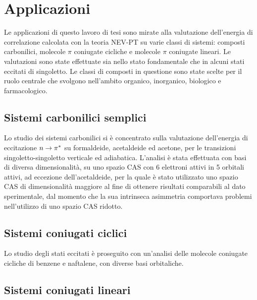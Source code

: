 \chapter{Applicazioni}
\label{cap:applicazioni}

Le applicazioni di questo lavoro di tesi sono mirate alla valutazione
dell'energia di correlazione calcolata con la teoria NEV-PT su
varie classi di sistemi: composti carbonilici, 
molecole $\pi$ coniugate cicliche e molecole $\pi$ coniugate lineari. Le
valutazioni sono state effettuate sia nello stato fondamentale che in alcuni
stati eccitati di singoletto. Le classi di composti in questione sono state
scelte per il ruolo centrale che svolgono nell'ambito organico, inorganico,
biologico e farmacologico.  

\section{Sistemi carbonilici semplici}

Lo studio dei sistemi carbonilici si \`e concentrato sulla valutazione
dell'energia di eccitazione $n \rightarrow \pi^{*}$ su formaldeide,
acetaldeide ed acetone, per le transizioni singoletto-singoletto
verticale ed adiabatica. L'analisi \`e stata effettuata con basi di diversa
dimensionalit\`a, su uno spazio CAS con 6 elettroni attivi in 5 orbitali attivi,
ad eccezione dell'acetaldeide,
per la quale \`e stato utilizzato uno spazio CAS di dimensionalit\`a maggiore
al fine di ottenere risultati comparabili al dato sperimentale, dal momento che
la sua intrinseca asimmetria comportava problemi nell'utilizzo di uno spazio
CAS ridotto.






\section{Sistemi coniugati ciclici}

Lo studio degli stati eccitati \`e proseguito con un'analisi 
delle molecole coniugate cicliche di benzene e naftalene, con
diverse basi orbitaliche.




\section{Sistemi coniugati lineari}

